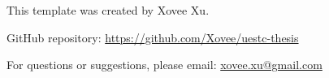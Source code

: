 \uestcacknowledgements

This template was created by Xovee Xu.

GitHub repository: \href{https://github.com/Xovee/uestc-thesis}{https://github.com/Xovee/uestc-thesis}

For questions or suggestions, please email:
\href{mailto:xovee.xu@gmail.com}{xovee.xu@gmail.com}
